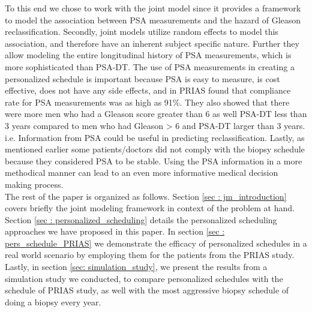 To this end we chose to work with the joint model since it provides a framework to model the association between PSA measurements and the hazard of Gleason reclassification. Secondly, joint models utilize random effects to model this association, and therefore have an inherent subject specific nature. Further they allow modeling the entire longitudinal history of PSA measurements, which is more sophisticated than PSA-DT. The use of PSA measurements in creating a personalized schedule is important because PSA is easy to measure, is cost effective, does not have any side effects, and in PRIAS \cite{bokhorst2015compliance} found that compliance rate for PSA measurements was as high as 91\%. They also showed that there were more men who had a Gleason score greater than 6 as well PSA-DT less than 3 years compared to men who had Gleason > 6 and PSA-DT larger than 3 years. i.e. Information from PSA could be useful in predicting reclassification. Lastly, as mentioned earlier some patients/doctors did not comply with the biopsy schedule because they considered PSA to be stable. Using the PSA information in a more methodical manner can lead to an even more informative medical decision making process.\\

The rest of the paper is organized as follows. Section \ref{sec : jm_introduction} covers briefly the joint modeling framework in context of the problem at hand. Section \ref{sec : personalized_scheduling} details the personalized scheduling approaches we have proposed in this paper. In section \ref{sec : pers_schedule_PRIAS} we demonstrate the efficacy of personalized schedules in a real world scenario by employing them for the patients from  the PRIAS study. Lastly, in section \ref{sec: simulation_study}, we present the results from a simulation study we conducted, to compare personalized schedules with the schedule of PRIAS study, as well with the most aggressive biopsy schedule of doing a biopsy every year.